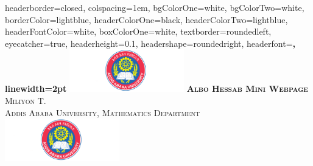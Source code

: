 \documentclass[landscape,a0paper,fontscale=0.285]{baposter} %
\begin{document}
\begin{poster}
{
headerborder=closed, %
colspacing=1em, %
bgColorOne=white, %
bgColorTwo=white, %
borderColor=lightblue, %
headerColorOne=black, %
headerColorTwo=lightblue, %
headerFontColor=white, %
boxColorOne=white, %
textborder=roundedleft, %
eyecatcher=true, %
headerheight=0.1\textheight, %
headershape=roundedright, %
headerfont=\Large\bf\textsc, %
linewidth=2pt %
}
%
{\includegraphics[height=5em]{logo.png}} %
{\bf\textsc{Albo Hessab Mini Webpage}\vspace{0.5em}} %
{\textsc{ Miliyon T.\\ \hspace{12pt} Addis Ababa University, Mathematics Department}} %
{\includegraphics[height=5em]{logo.png}} %



\end{poster}
\end{document}
